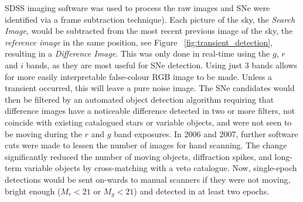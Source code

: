 SDSS imaging software\citep{stoughton2002sloan} was used to process the raw images and SNe were identified via a frame subtraction technique\citep{alard1998method}).
Each picture of the sky, the \textit{Search Image}, would be subtracted from the most recent previous image of the sky, the \textit{reference image} in the same position, see Figure ~\ref{fig:transient_detection}, resulting in a \textit{Difference Image}.
This was only done in real-time using the $g$, $r$ and $i$ bands, as they are most useful for SNe detection.
Using just 3 bands allows for more easily interpretable false-colour RGB image to be made.
Unless a transient occurred, this will leave a pure noise image.
The SNe candidates would then be filtered by an automated object detection algorithm requiring that difference images have a noticeable difference detected in two or more filters, not coincide with existing catalogued stars or variable objects, and were not seen to be moving during the $r$ and $g$ band exposures.
In 2006 and 2007, further software cuts were made to lessen the number of images for hand scanning.
The change significantly reduced the number of moving objects, diffraction spikes, and long-term variable objects by cross-matching with a veto catalogue.
Now, single-epoch detections would be sent on-wards to manual scanners if they were not moving, bright enough ($M_r < 21$ or $M_g < 21$) and detected in at least two epochs.
